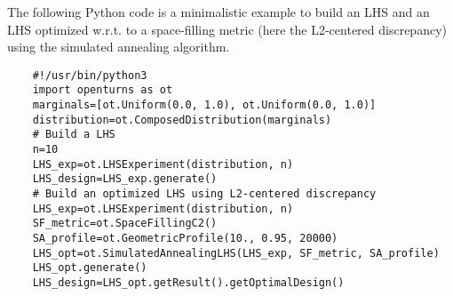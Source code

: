 \begin{otexample}
    The following Python code is a minimalistic \ot example to build an LHS and 
    an LHS optimized w.r.t. to a space-filling metric (here the L2-centered discrepancy) using the simulated annealing algorithm. 
    \lstset{style=mystyle, language=python}
%
\begin{lstlisting}
    #!/usr/bin/python3
    import openturns as ot
    marginals=[ot.Uniform(0.0, 1.0), ot.Uniform(0.0, 1.0)]
    distribution=ot.ComposedDistribution(marginals)
    # Build a LHS
    n=10
    LHS_exp=ot.LHSExperiment(distribution, n)
    LHS_design=LHS_exp.generate()
    # Build an optimized LHS using L2-centered discrepancy
    LHS_exp=ot.LHSExperiment(distribution, n)
    SF_metric=ot.SpaceFillingC2()
    SA_profile=ot.GeometricProfile(10., 0.95, 20000)
    LHS_opt=ot.SimulatedAnnealingLHS(LHS_exp, SF_metric, SA_profile)
    LHS_opt.generate()
    LHS_design=LHS_opt.getResult().getOptimalDesign()
\end{lstlisting}
%
\end{otexample}



